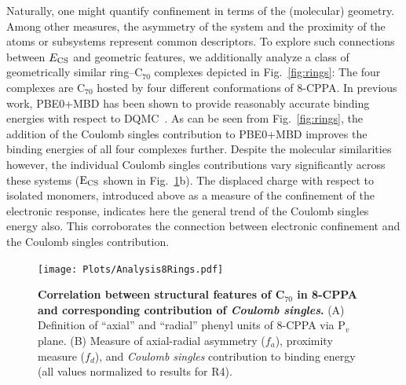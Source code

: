 \documentclass[aps,prl,groupaddress, twocolumn]{revtex4-1}  %
\begin{document}
Naturally, one might quantify confinement in terms of the (molecular) geometry. Among other measures, the asymmetry of the system and the proximity of the atoms or subsystems represent common descriptors. To explore such connections between $E_{\rm CS}$ and geometric features, we additionally analyze a class of geometrically similar ring--C$_{70}$ complexes depicted in Fig.~\ref{fig:rings}: The four complexes are C$_{70}$ hosted by four different conformations of 8-CPPA\@.
In previous work, PBE0+MBD has been shown to provide reasonably accurate binding energies with respect to DQMC~\cite{hermann_ncomm2017}. As can be seen from Fig.~\ref{fig:rings}, the addition of the Coulomb singles contribution to PBE0+MBD improves the binding energies of all four complexes further. Despite the molecular similarities however, the individual Coulomb singles contributions vary significantly across these systems ($\rm E_{CS}$ shown in Fig.~\ref{fig:analysis_rings}b). The displaced charge with respect to isolated monomers, introduced above as a measure of the confinement of the electronic response, indicates here the general trend of the Coulomb singles energy also. This corroborates the connection between electronic confinement and the Coulomb singles contribution.

\begin{figure}[htp]
\texttt{[image: Plots/Analysis8Rings.pdf]}
\caption{\textbf{Correlation between structural features of C$_{70}$ in 8-CPPA and corresponding contribution of \emph{Coulomb singles}.} (A) Definition of ``axial'' and ``radial'' phenyl units of 8-CPPA via P$_v$ plane. (B) Measure of axial-radial asymmetry ($f_a$), proximity measure ($f_d$), and \emph{Coulomb singles} contribution to binding energy (all values normalized to results for R4).}\label{fig:analysis_rings}
\end{figure}
\end{document}

